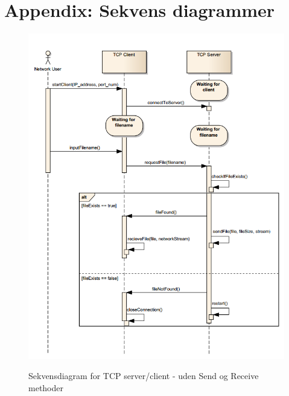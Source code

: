 \appendix
\section{Appendix: Sekvens diagrammer}

\begin{figure}[h]
	\centering
	\caption{Sekvensdiagram for TCP server/client - uden Send og Receive methoder}
	\includegraphics[width=0.84\linewidth]{figs/sequence.png}
	\label{fig:sequence}
\end{figure}
